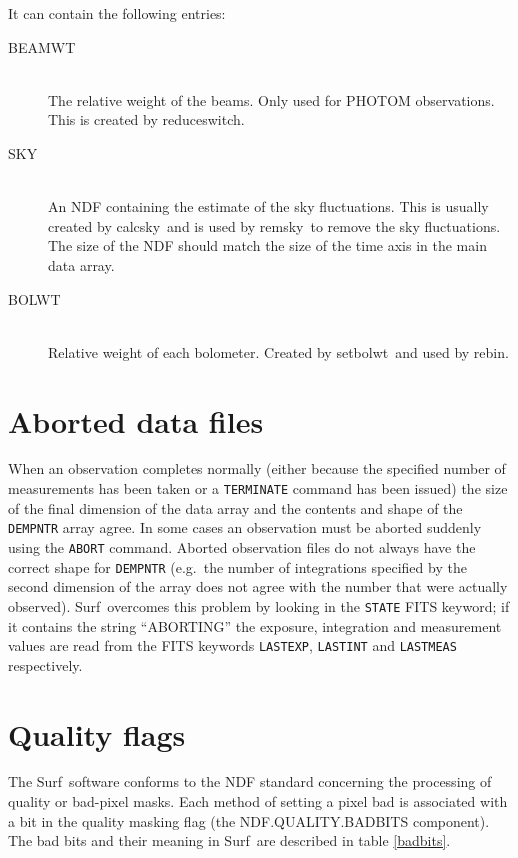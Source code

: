 \documentclass[twoside,11pt]{article}
\newcommand{\task}[1]{{\sf #1}}
\newcommand{\rebin}{\xref{\task{rebin}}{sun216}{REBIN}}
\newcommand{\calcsky}{\xref{\task{calcsky}}{sun216}{CALCSKY}}
\newcommand{\resw}{\xref{\task{reduce\_switch}}{sun216}{REDUCE_SWITCH}}
\newcommand{\remsky}{\xref{\task{remsky}}{sun216}{REMSKY}}
\newcommand{\setbolwt}{\xref{\task{setbolwt}}{sun216}{SETBOLWT}}
\newcommand{\scusoft}          {{\sc Surf}}
\newcommand{\xref}[3]{#1}
\newcommand{\xlabel}[1]{}
\renewcommand{\_}{\texttt{\symbol{95}}}
\begin{document}
It can contain the following entries:

\begin{description}
\item[BEAM\_WT]\mbox{} \\
The relative weight of the beams. Only used for PHOTOM observations. This is
created by \resw.
\item[SKY]\mbox{} \\
An NDF containing the estimate of the sky fluctuations. This is usually
created by \calcsky\ and is used by \remsky\ to remove the sky fluctuations.
The size of the NDF should match the size of the time axis in the main data
array.
\item[BOLWT]\mbox{} \\
Relative weight of each bolometer. Created by \setbolwt\ and used by \rebin.
\end{description}


\section{Aborted data files}

When an observation completes normally (either because the specified number of
measurements has been taken or a \texttt{TERMINATE} command has been issued)
the size of the final dimension of the data array and the contents and shape
of the \texttt{DEM\_PNTR} array agree.  In some cases an observation must be
aborted suddenly using the \texttt{ABORT} command.
Aborted observation files do not always have the correct shape for
\texttt{DEM\_PNTR} (e.g.\ the number of integrations specified by the second
dimension of the array does not agree with the number that were actually
observed). \scusoft\ overcomes this problem by looking in the \texttt{STATE}
FITS keyword; if it contains the string ``ABORTING'' the exposure, integration
and measurement values are read from the FITS keywords \texttt{LAST\_EXP},
\texttt{LAST\_INT} and \texttt{LAST\_MEAS} respectively.



\section{\xlabel{quality}Quality flags\label{sec:quality}}

The \scusoft\ software conforms to the NDF standard concerning the processing
of quality or bad-pixel masks. Each method of setting a pixel bad is
associated with a bit in the quality masking flag (the NDF.QUALITY.BADBITS
component). The bad bits and their meaning in \scusoft\ are described in table
\ref{badbits}.
\end{document}
